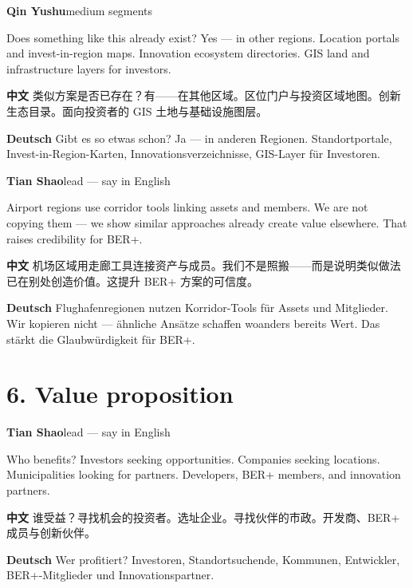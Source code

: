 \documentclass[11pt,a4paper]{ctexart}
\newenvironment{speakerblock}[2]{%
  \par\medskip
  {\color{berblue}\textbf{#1}}\hfill{\small\textcolor{bergrey}{#2}}\par
  \vspace{0.25em}
}{\par\medskip}
\begin{document}
\begin{speakerblock}{Qin Yushu}{medium segments}
\begin{englishbox}
Does something like this already exist? Yes — in other regions. Location portals and invest-in-region maps. Innovation ecosystem directories. GIS land and infrastructure layers for investors.
\end{englishbox}

\textbf{中文} 类似方案是否已存在？有——在其他区域。区位门户与投资区域地图。创新生态目录。面向投资者的 GIS 土地与基础设施图层。

\textbf{Deutsch} Gibt es so etwas schon? Ja — in anderen Regionen. Standortportale, Invest-in-Region-Karten, Innovationsverzeichnisse, GIS-Layer für Investoren.
\end{speakerblock}


\begin{speakerblock}{Tian Shao}{lead — say in English}
\begin{englishbox}
Airport regions use corridor tools linking assets and members. We are not copying them — we show similar approaches already create value elsewhere. That raises credibility for BER+.
\end{englishbox}

\textbf{中文} 机场区域用走廊工具连接资产与成员。我们不是照搬——而是说明类似做法已在别处创造价值。这提升 BER+ 方案的可信度。

\textbf{Deutsch} Flughafenregionen nutzen Korridor-Tools für Assets und Mitglieder. Wir kopieren nicht — ähnliche Ansätze schaffen woanders bereits Wert. Das stärkt die Glaubwürdigkeit für BER+.
\end{speakerblock}



\section{6. Value proposition}

\begin{speakerblock}{Tian Shao}{lead — say in English}
\begin{englishbox}
Who benefits? Investors seeking opportunities. Companies seeking locations. Municipalities looking for partners. Developers, BER+ members, and innovation partners.
\end{englishbox}

\textbf{中文} 谁受益？寻找机会的投资者。选址企业。寻找伙伴的市政。开发商、BER+ 成员与创新伙伴。

\textbf{Deutsch} Wer profitiert? Investoren, Standortsuchende, Kommunen, Entwickler, BER+-Mitglieder und Innovationspartner.
\end{speakerblock}
\end{document}

